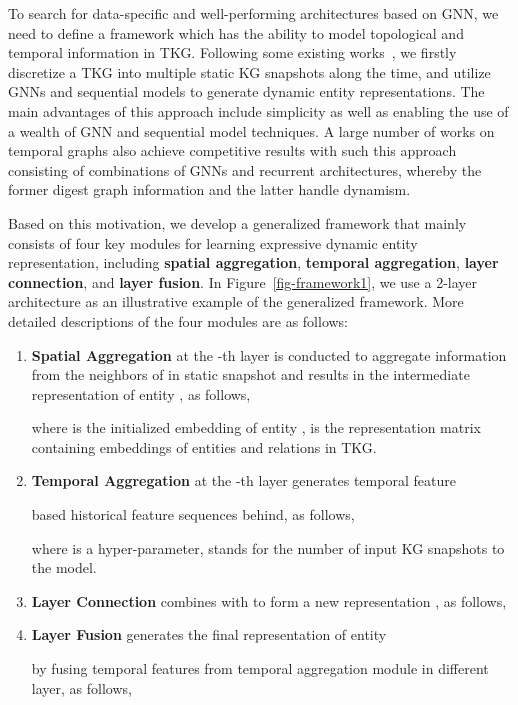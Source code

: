 \documentclass[11pt]{article}
\begin{document}
To search for data-specific and well-performing architectures based on GNN, 
we need to define a framework 
which has the ability to model topological and temporal information in TKG.
Following some existing works~\citep{taheri2019learning, sankar2020dysat, manessi2020dynamic,wu-etal-2020-temp,gao2022a,wang2022evolutionary},
we firstly discretize a TKG into multiple static KG snapshots along the time,
and utilize GNNs and sequential models to generate dynamic entity representations.
The main advantages of this approach 
include simplicity as well as 
enabling the use of a wealth of GNN and sequential model techniques.
A large number of works on temporal graphs also achieve competitive results with such this approach consisting of combinations of GNNs and recurrent architectures,
whereby the former digest graph information and the latter handle dynamism. 

Based on this motivation,
we develop a generalized framework that 
mainly consists of four key modules 
for learning expressive dynamic entity representation, 
including 
\textbf{spatial aggregation},
\textbf{temporal aggregation}, 
\textbf{layer connection}, 
and \textbf{layer fusion}. 
In Figure~\ref{fig-framework1},
we use a 2-layer architecture 
as an illustrative example of the generalized framework. 
More detailed descriptions of the four modules are as follows:

\begin{enumerate}[leftmargin=*]
	\item \textbf{Spatial Aggregation} at the -th layer is conducted to 
	aggregate information from the neighbors of  in static snapshot  
	and results in the intermediate representation of entity , as follows,
	
	where  is the initialized embedding of entity , 
	 is the representation matrix containing embeddings of entities and relations in TKG. 

	\item \textbf{Temporal Aggregation} at the -th layer generates temporal feature
	
	based historical feature sequences 
	 behind, as follows,
	
	where  is a hyper-parameter, stands for the number of input KG snapshots to the model. 
	\item \textbf{Layer Connection} combines  with  to form a new representation , as follows,
	
	\item \textbf{Layer Fusion} generates the final representation of entity
	 
	by fusing temporal features from temporal aggregation module in different layer, as follows,
	
\end{enumerate}
\end{document}
